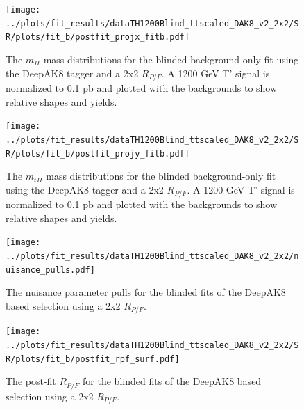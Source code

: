 \documentclass[10pt,oneside]{article}
\begin{document}
\begin{figure}[H]
    \centering
    \texttt{[image: ../plots/fit\_results/dataTH1200Blind\_ttscaled\_DAK8\_v2\_2x2/SR/plots/fit\_b/postfit\_projx\_fitb.pdf]}
    \caption{The $m_H$ mass distributions for the blinded background-only fit using the DeepAK8 tagger and a 2x2 $R_{P/F}$.
    A 1200 GeV T' signal is normalized to 0.1 pb and plotted with the backgrounds to show relative shapes and yields.}
    \label{figs:DAK8_mh_2x2}
\end{figure}
\begin{figure}[H]
    \centering
    \texttt{[image: ../plots/fit\_results/dataTH1200Blind\_ttscaled\_DAK8\_v2\_2x2/SR/plots/fit\_b/postfit\_projy\_fitb.pdf]}
    \caption{The $m_{tH}$ mass distributions for the blinded background-only fit using the DeepAK8 tagger and a 2x2 $R_{P/F}$.
    A 1200 GeV T' signal is normalized to 0.1 pb and plotted with the backgrounds to show relative shapes and yields.}
    \label{figs:DAK8_mth_2x2}
\end{figure}
\begin{figure}[H]
    \centering
    \texttt{[image: ../plots/fit\_results/dataTH1200Blind\_ttscaled\_DAK8\_v2\_2x2/nuisance\_pulls.pdf]}
    \caption{The nuisance parameter pulls for the blinded fits of the DeepAK8 based selection using a 2x2 $R_{P/F}$.}
    \label{figs:DAK8_nuis_2x2}
\end{figure}
\begin{figure}[H]
    \centering
    \texttt{[image: ../plots/fit\_results/dataTH1200Blind\_ttscaled\_DAK8\_v2\_2x2/SR/plots/fit\_b/postfit\_rpf\_surf.pdf]}
    \caption{The post-fit $R_{P/F}$ for the blinded fits of the DeepAK8 based selection using a 2x2 $R_{P/F}$.}
    \label{figs:DAK8_rpf_2x2}
\end{figure}
\end{document}
